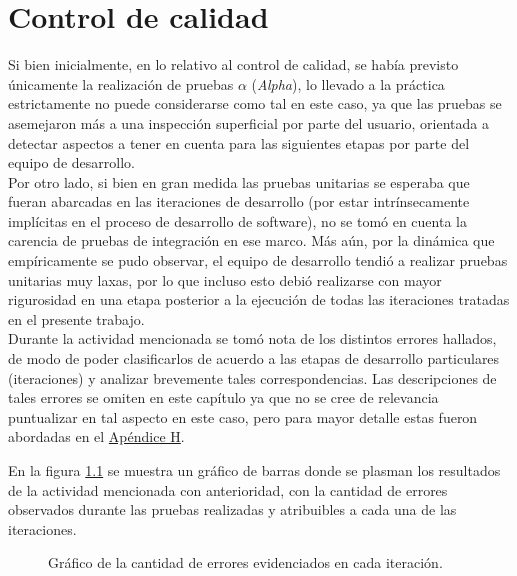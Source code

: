 \documentclass[a4paper, 12pt,twoside]{report}  %
\numberwithin{equation}{subsection} %
\begin{document}
\chapter{Control de calidad}
\label{Control de calidad}
Si bien inicialmente, en lo relativo al control de calidad, se había previsto únicamente la realización de pruebas \begin{math}\alpha\end{math} (\textit{Alpha}), lo llevado a la práctica estrictamente no puede considerarse como tal en este caso, ya que las pruebas se asemejaron más a una inspección superficial por parte del usuario, orientada a detectar aspectos a tener en cuenta para las siguientes etapas por parte del equipo de desarrollo.\\
\indent Por otro lado, si bien en gran medida las pruebas unitarias se esperaba que fueran abarcadas en las iteraciones de desarrollo (por estar intrínsecamente implícitas en el proceso de desarrollo de software), no se tomó en cuenta la carencia de pruebas de integración en ese marco. Más aún, por la dinámica que empíricamente se pudo observar, el equipo de desarrollo tendió a realizar pruebas unitarias muy laxas, por lo que incluso esto debió realizarse con mayor rigurosidad en una etapa posterior a la ejecución de todas las iteraciones tratadas en el presente trabajo.\\
\indent Durante la actividad mencionada se tomó nota de los distintos errores hallados, de modo de poder clasificarlos de acuerdo a las etapas de desarrollo particulares (iteraciones) y analizar brevemente tales correspondencias. Las descripciones de tales errores se omiten en este capítulo ya que no se cree de relevancia puntualizar en tal aspecto en este caso, pero para mayor detalle estas fueron abordadas en el \hyperlink{apendice_h}{Apéndice H}.

\indent En la figura \ref{grafico_errores_iteracion} se muestra un gráfico de barras donde se plasman los resultados de la actividad mencionada con anterioridad, con la cantidad de errores observados durante las pruebas realizadas y atribuibles a cada una de las iteraciones.

\begin{figure}[h]
	\centering
	\caption{Gráfico de la cantidad de errores evidenciados en cada iteración.}
	\label{grafico_errores_iteracion}
\end{figure}
\end{document}
